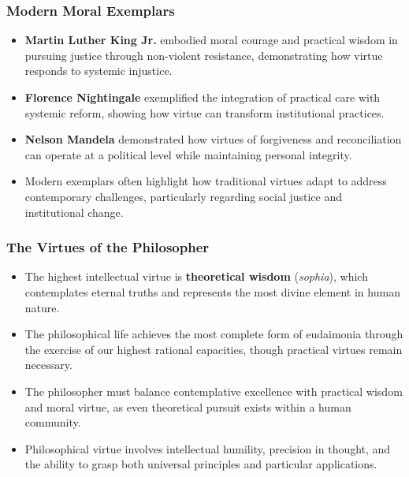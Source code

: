 \documentclass{beamer}
\begin{document}
\begin{frame}
    \frametitle{Modern Moral Exemplars}
    \begin{itemize}
        \item \textbf{Martin Luther King Jr.} embodied moral courage and practical wisdom in pursuing justice through non-violent resistance, demonstrating how virtue responds to systemic injustice.
        
        \item \textbf{Florence Nightingale} exemplified the integration of practical care with systemic reform, showing how virtue can transform institutional practices.
        
        \item \textbf{Nelson Mandela} demonstrated how virtues of forgiveness and reconciliation can operate at a political level while maintaining personal integrity.
        
        \item Modern exemplars often highlight how traditional virtues adapt to address contemporary challenges, particularly regarding social justice and institutional change.
    \end{itemize}
\end{frame}

\begin{frame}
    \frametitle{The Virtues of the Philosopher}
    \begin{itemize}
        \item The highest intellectual virtue is \textbf{theoretical wisdom} (\textit{sophia}), which contemplates eternal truths and represents the most divine element in human nature.
        
        \item The philosophical life achieves the most complete form of eudaimonia through the exercise of our highest rational capacities, though practical virtues remain necessary.
        
        \item The philosopher must balance contemplative excellence with practical wisdom and moral virtue, as even theoretical pursuit exists within a human community.
        
        \item Philosophical virtue involves intellectual humility, precision in thought, and the ability to grasp both universal principles and particular applications.
    \end{itemize}
\end{frame}
\end{document}
